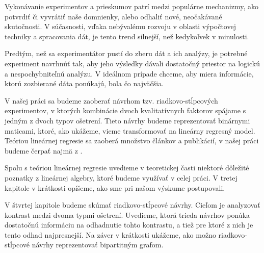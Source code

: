 Vykonávanie experimentov a prieskumov patrí medzi populárne mechanizmy, ako potvrdiť či vyvrátiť naše domnienky, alebo odhaliť nové, neočakávané skutočnosti. 
V súčasnosti, vďaka nebývalému rozvoju v oblasti výpočtovej techniky a spracovania dát, je tento trend silnejší, než kedykoľvek v minulosti.

Predtým, než sa experimentátor pustí do zberu dát a ich analýzy, je potrebné experiment navrhnúť tak, aby jeho výsledky dávali dostatočný priestor na 
logickú a nespochybniteľnú analýzu. V ideálnom prípade chceme, aby miera informácie, ktorú zozbierané dáta ponúkajú, bola čo najväčšia.

V našej práci sa budeme zaoberať návrhom tzv. riadkovo-stĺpcových experimentov, v ktorých kombinácie dvoch kvalitatívnych faktorov spájame s jedným z dvoch typov ošetrení. 
Tieto návrhy budeme reprezentovať binárnymi maticami, ktoré, ako ukážeme, vieme transformovať na lineárny regresný model. 
Teóriou lineárnej regresie sa zaoberá množstvo článkov a publikácií, v našej práci budeme čerpať najmä z \cite{pazman, yan}.

Spolu s teóriou lineárnej regresie uvedieme v teoretickej časti niektoré dôležité poznatky z lineárnej algebry, ktoré budeme využívať v celej práci. 
V tretej kapitole v krátkosti opíšeme, ako sme pri našom výskume postupovali.

V štvrtej kapitole budeme skúmať riadkovo-stĺpcové návrhy. Cieľom je analyzovať kontrast medzi dvoma typmi ošetrení. 
Uvedieme, ktorá trieda návrhov ponúka dostatočnú informáciu na odhadnutie tohto kontrastu, a tiež pre ktoré z nich je tento odhad najpresnejší. 
Na záver v krátkosti ukážeme, ako možno riadkovo-stĺpcové návrhy reprezentovať bipartitným grafom.